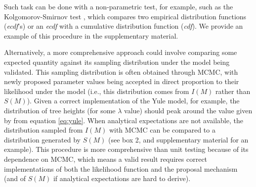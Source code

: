 \documentclass[oneside]{article}
\begin{document}
\begin{tcolorbox}[breakable, width=\textwidth, colback=gray!10, boxrule=0pt,
  title=Box 2: Additional validation sanity-checks, fonttitle=\bfseries]
  \vspace{.15cm}
  Such task can be done with a non-parametric test, for example, such
  as the Kolgomorov-Smirnov test \citep{kolgomorov,smirnov,ks}, which
  compares two empirical distribution functions (\emph{ecdf}'s) or an
  \emph{ecdf} with a cumulative distribution function (\emph{cdf}).
  We provide an example of this procedure in the supplementary material.
\end{tcolorbox}

Alternatively, a more comprehensive approach could involve comparing
some expected quantity against its sampling distribution under the
model being validated.
This sampling distribution is often obtained through MCMC, with
newly proposed parameter values being accepted in direct proportion to
their likelihood under the model (i.e., this distribution comes from
$I(M)$ rather than $S(M)$).
Given a correct implementation of the Yule model, for example, the
distribution of tree heights (for some $\lambda$ value) should peak around the
value given by from equation \ref{eq:yule}.
When analytical expectations are not available, the distribution
sampled from $I(M)$ with MCMC can be compared to a distribution
generated by $S(M)$ (see box 2, and supplementary material for an example).
This procedure is more comprehensive than unit testing because of its
dependence on MCMC, which means a valid result requires correct
implementations of both the likelihood function and the proposal mechanism
(and of $S(M)$ if analytical expectations are hard to derive).



\end{document}
